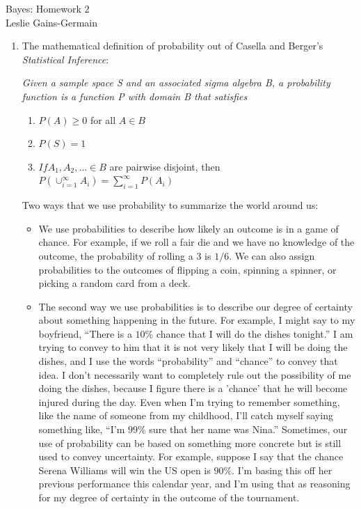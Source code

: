 \documentclass[12pt]{article}\usepackage[]{graphicx}\usepackage[]{color}
\begin{document}
  
  
\begin{center}
\large{Bayes: Homework $2$} \\
Leslie Gains-Germain
\end{center}

\begin{doublespacing}

\begin{enumerate}

\item The mathematical definition of probability out of Casella and Berger's {\it Statistical Inference}:

{\it Given a sample space S and an associated sigma algebra B, a probability function is a function P with domain B that satisfies
\begin{enumerate}
\item $P(A) \geq 0$ for all $A \in B$
\item $P(S) = 1$ 
\item $If A_1, A_2,...\in B$ are pairwise disjoint, then $P(\cup_{i=1}^{\infty}A_i) = \sum_{i=1}^{\infty}P(A_i)$
\end{enumerate}}

Two ways that we use probability to summarize the world around us: 
\begin{itemize}
\item We use probabilities to describe how likely an outcome is in a game of chance. For example, if we roll a fair die and we have no knowledge of the outcome, the probability of rolling a $3$ is $1/6$. We can also assign probabilities to the outcomes of flipping a coin, spinning a spinner, or picking a random card from a deck.
\item The second way we use probabilities is to describe our degree of certainty about something happening in the future. For example, I might say to my boyfriend, ``There is a $10\%$ chance that I will do the dishes tonight.'' I am trying to convey to him that it is not very likely that I will be doing the dishes, and I use the words ``probability'' and ``chance'' to convey that idea. I don't necessarily want to completely rule out the possibility of me doing the dishes, because I figure there is a 'chance' that he will become injured during the day. Even when I'm trying to remember something, like the name of someone from my childhood, I'll catch myself saying something like, ``I'm $99\%$ sure that her name was Nina.'' Sometimes, our use of probability can be based on something more concrete but is still used to convey uncertainty. For example, suppose I say that the chance Serena Williams will win the US open is $90\%$. I'm basing this off her previous performance this calendar year, and I'm using that as reasoning for my degree of certainty in the outcome of the tournament.
\end{itemize}


\end{enumerate}
\end{doublespacing}
\end{document}
